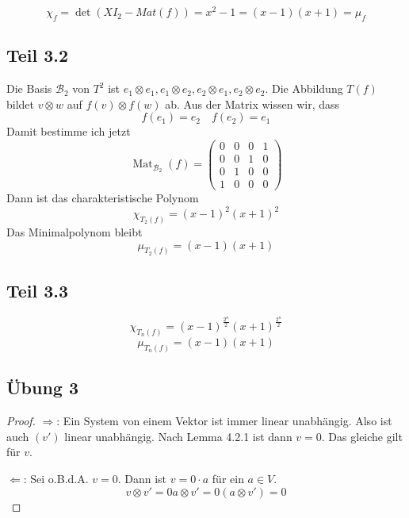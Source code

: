 \documentclass[10pt,a4paper]{article}
\DeclareMathOperator{\Mat}{Mat}
\begin{document}
\begin{equation}
\chi_{f} = \det(XI_{2} - Mat(f)) = x^{2} - 1 = (x - 1)(x + 1) = \mu_{f}
\end{equation}

\subsection*{Teil 3.2}

Die Basis $\mathcal{B}_{2}$ von $T^{2}$ ist $e_{1} \otimes e_{1}, e_{1} \otimes e_{2}, e_{2} \otimes e_{1}, e_{2} \otimes e_{2}$.
Die Abbildung $T(f)$ bildet $v \otimes w$ auf $f(v) \otimes f(w)$ ab.
Aus der Matrix wissen wir, dass
\begin{equation}
f(e_{1}) = e_{2} \quad f(e_{2}) = e_{1}
\end{equation}
Damit bestimme ich jetzt
\begin{equation}
\Mat_{\mathcal{B}_{2}}(f) = \begin{pmatrix}
0 & 0 & 0 & 1\\
0 & 0 & 1 & 0\\
0 & 1 & 0 & 0\\
1 & 0 & 0 & 0
\end{pmatrix}
\end{equation}
Dann ist das charakteristische Polynom
\begin{equation}
\chi_{T_{2}(f)} = (x - 1)^{2}(x + 1)^{2}
\end{equation}
Das Minimalpolynom bleibt
\begin{equation}
\mu_{T_{2}(f)} = (x - 1)(x + 1)
\end{equation}

\subsection*{Teil 3.3}

\begin{equation}
\chi_{T_{n}(f)} = (x - 1)^{\frac{2^{n}}{2}}(x + 1)^{\frac{2^{n}}{2}}
\end{equation}
\begin{equation}
\mu_{T_{n}(f)} = (x - 1)(x + 1)
\end{equation}

\subsection*{Übung 3}

\begin{proof}
$\Rightarrow$: Ein System von einem Vektor ist immer linear unabhängig.
Also ist auch $(v')$ linear unabhängig.
Nach Lemma 4.2.1 ist dann $v = 0$.
Das gleiche gilt für $v$.

$\Leftarrow$: Sei o.B.d.A. $v = 0$.
Dann ist $v = 0 \cdot a$ für ein $a \in V$.
\begin{equation}
v \otimes v' = 0a \otimes v' = 0(a \otimes v') = 0
\end{equation}
\end{proof}
\end{document}

